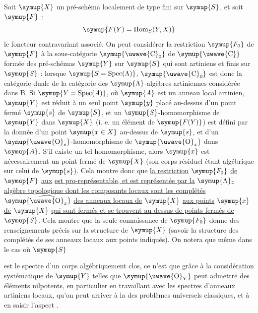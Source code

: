 Soit $\symup{X}$ un pré-schéma localement de type fini sur $\symup{S}$, et soit $\symup{F}$ :
\[
  \symup{F(Y)=\operatorname{Hom}_S(Y,X)}
\]
le foncteur contravariant associé. On peut considérer la restriction $\symup{F_0}$ de
$\symup{F}$ à la sous-catégorie $\symup{\text{\uwave{C}}_0}$ de $\symup{\text{\uwave{C}}}$ formée des
pré-schémas $\symup{Y}$ sur $\symup{S}$ qui sont artiniens et finis sur $\symup{S}$ : lorsque
$\symup{S=\operatorname{Spec}(\Lambda)}$, $\symup{\text{\uwave{C}}_0}$ est donc la catégorie duale
de la catégorie des $\symup{\Lambda}$-algèbres artiniennes considérée dans B. Si
$\symup{Y=\operatorname{Spec}(A)}$, où $\symup{A}$ est un anneau \uline{local} artinien, $\symup{Y}$ est
réduit à un seul point $\symup{y}$ placé au-dessus d'un point fermé $\symup{s}$ de $\symup{S}$, et un
$\symup{S}$-homomorphisme de $\symup{Y}$ dans $\symup{X}$ (i. e. un élément de $\symup{F(Y)}$) est défini par
la donnée d'un point $\symup{x\in X}$ au-dessus de $\symup{s}$, et d'un
$\symup{\text{\uwave{O}}_s}$-homomorphisme de $\symup{\text{\uwave{O}}_x}$ dans $\symup{A}$. S'il existe
un tel homomorphisme, alors $\symup{x}$ est nécessairement un point fermé de $\symup{X}$ (son
corps résiduel étant algébrique sur celui de $\symup{s}$). Cela montre donc que \uline{la restriction} $\symup{F_0}$ \uline{de} $\symup{F}$ \uline{aux}  \uline{est
pro-représentable, et est représentée par la} $\symup{\Lambda}$\uline{-algèbre topologique
dont les composants locaux sont les complétés}
$\symup{\widehat{\text{\uwave{O}}}_x}$ \uline{des anneaux locaux de} $\symup{X}$ \uline{aux points} $\symup{x}$ \uline{de} $\symup{X}$
\uline{qui sont fermés et se trouvent au-dessus de points fermés de} $\symup{S}$. Cela montre
que la seule connaissance de $\symup{F_0}$ donne des renseignements précis sur la
structure de $\symup{X}$ (savoir la structure des complétés de ses anneaux locaux aux
points indiqués). On notera que même dans le cas où $\symup{S}$

est le spectre d'un corps algébriquement clos, ce n'est que grâce à la
considération systématique de  $\symup{Y}$ telles que
$\symup{\text{\uwave{O}}_Y}$ peut admettre des éléments nilpotents, en particulier en
travaillant avec les spectres d'anneaux artiniens locaux, qu'on peut arriver à
la  des problèmes universels classiques, et à en saisir
l'aspect .

